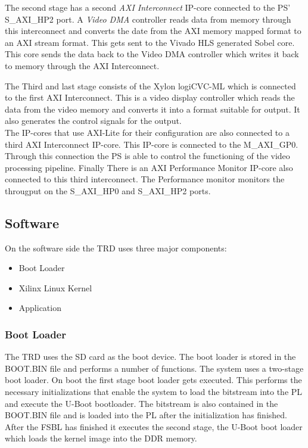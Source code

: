 The second stage has a second \emph{AXI Interconnect} IP-core connected to the PS' S\_AXI\_HP2 port. A \emph{Video DMA} controller reads data from memory through this interconnect and converts the date from the AXI memory mapped format to an AXI stream format. This gets sent to the Vivado HLS generated Sobel core. This core sends the data back to the Video DMA controller which writes it back to memory through the AXI Interconnect.


The Third and last stage consists of the Xylon logiCVC-ML which is connected to the first AXI Interconnect. This is a video display controller which reads the data from the video memory and converts it into a format suitable for output. It also generates the control signals for the output.\\
The IP-cores that use AXI-Lite for their configuration are also connected to a third AXI Interconnect IP-core. This IP-core is connected to the M\_AXI\_GP0. Through this connection the PS is able to control the functioning of the video processing pipeline. Finally There is an AXI Performance Monitor IP-core also connected to this third interconnect. The Performance monitor monitors the througput on the S\_AXI\_HP0 and S\_AXI\_HP2 ports. 





\subsection{Software}
On the software side the TRD uses three major components:
\begin{itemize}
	\item Boot Loader
	\item Xilinx Linux Kernel
	\item Application
\end{itemize}

\subsubsection{Boot Loader} The TRD uses the SD card as the boot device. The boot loader is stored in the BOOT.BIN file and performs a number of functions. The system uses a two-stage boot loader. On boot the first stage boot loader gets executed. This performs the necessary initializations that enable the system to load the bitstream into the PL and execute the U-Boot bootloader. The bitstream is also contained in the BOOT.BIN file and is loaded into the PL after the initialization has finished. After the FSBL has finished it executes the second stage, the U-Boot boot loader which loads the kernel image into the DDR memory.

